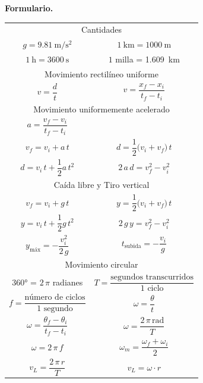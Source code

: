 \documentclass[12pt, letter]{exam}
\begin{document}
\textbf{\huge{Formulario.}}
\begin{table}[H]
    \centering
    \setlength{\tabcolsep}{40pt}
    \renewcommand{\arraystretch}{2}
    \begin{tabular}{c  c}
        \multicolumn{2}{c}{Cantidades} \\
            $g = \SI{9.81}{\meter\per\square\second}$ & $\SI{1}{\kilo\meter} = \SI{1000}{\meter}$  \\
            $\SI{1}{\hour} = \SI{3600}{\second}$ & $1$ milla = \SI{1.609}{\kilo\meter} \\ \hline
        \multicolumn{2}{c}{Movimiento rectilíneo uniforme} \\
            $v = \dfrac{d}{t}$ & $v = \dfrac{x_{f} - x_{i}}{t_{f} - t_{i}}$ \\ \hline
		\multicolumn{2}{c}{Movimiento uniformemente acelerado} \\
            $a = \dfrac{v_{f} - v_{i}}{t_{f} - t_{i}}$ & \\
            $v_{f} = v_{i} + a \, t$ & $d = \dfrac{1}{2} \big( v_{i} + v_{f} \big) \, t$ \\
            $d = v_{i} \, t + \dfrac{1}{2} a \, t^{2}$ & $2 \, a \, d = v_{f}^{2} - v_{i}^{2}$ \\ \hline
        \multicolumn{2}{c}{Caída libre y Tiro vertical} \\
            $v_{f} = v_{i} + g \, t$ & $y = \dfrac{1}{2} \big( v_{i} + v_{f} \big) \, t$ \\
            $y = v_{i} \, t + \dfrac{1}{2} g \, t^{2}$ & $2 \, g \, y = v_{f}^{2} - v_{i}^{2}$ \\ 
            $y_{\text{máx}} = - \dfrac{v_{i}^{2}}{2 \, g}$ & $t_{\text{subida}} = - \dfrac{v_{i}}{g}$ \\ \hline
        \multicolumn{2}{c}{Movimiento circular} \\
        \ang{360} = $2 \, \pi$ radianes & $T = \dfrac{\text{segundos transcurridos}}{\text{1 ciclo}}$ \\
        $f = \dfrac{\text{número de ciclos}}{\text{1 segundo}}$ & $\omega = \dfrac{\theta}{t}$ \\
        $\omega = \dfrac{\theta_{f} - \theta_{i}}{t_{f} - t_{i}}$ & $\omega = \dfrac{2 \, \pi \, \text{rad}}{T}$ \\
        $\omega = 2 \, \pi \, f $ & $\omega_{m} = \dfrac{\omega_{f} + \omega_{i}}{2}$ \\
        $v_{L} = \dfrac{2 \, \pi \, r}{T}$ & $v_{L} = \omega \cdot r$ \\
    \end{tabular}
\end{table}
\end{document}
